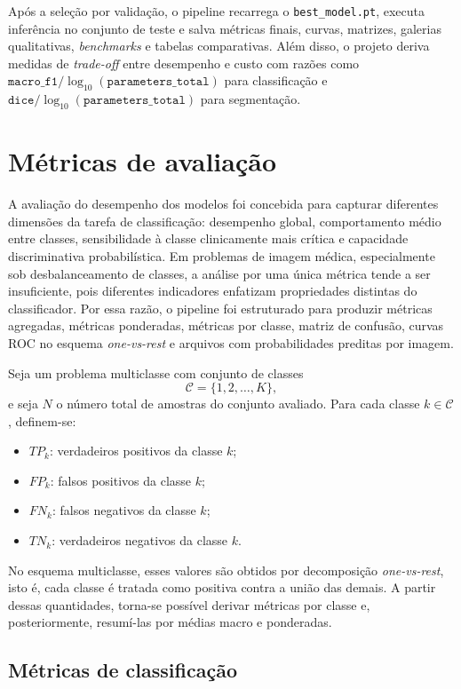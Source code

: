 \documentclass[tcc,capa]{texufpel}
\begin{document}
Após a seleção por validação, o pipeline recarrega o \texttt{best\_model.pt}, executa inferência no conjunto de teste e salva métricas finais, curvas, matrizes, galerias qualitativas, \textit{benchmarks} e tabelas comparativas. Além disso, o projeto deriva medidas de \textit{trade-off} entre desempenho e custo com razões como \(\texttt{macro\_f1}/\log_{10}(\texttt{parameters\_total})\) para classificação e \(\texttt{dice}/\log_{10}(\texttt{parameters\_total})\) para segmentação.

\section{Métricas de avaliação}

A avaliação do desempenho dos modelos foi concebida para capturar diferentes dimensões da tarefa de classificação: desempenho global, comportamento médio entre classes, sensibilidade à classe clinicamente mais crítica e capacidade discriminativa probabilística. Em problemas de imagem médica, especialmente sob desbalanceamento de classes, a análise por uma única métrica tende a ser insuficiente, pois diferentes indicadores enfatizam propriedades distintas do classificador. Por essa razão, o pipeline foi estruturado para produzir métricas agregadas, métricas ponderadas, métricas por classe, matriz de confusão, curvas ROC no esquema \textit{one-vs-rest} e arquivos com probabilidades preditas por imagem.

Seja um problema multiclasse com conjunto de classes
\[
\mathcal{C} = \{1,2,\dots,K\},
\]
e seja \(N\) o número total de amostras do conjunto avaliado. Para cada classe \(k \in \mathcal{C}\), definem-se:
\begin{itemize}
	\item \(TP_k\): verdadeiros positivos da classe \(k\);
	\item \(FP_k\): falsos positivos da classe \(k\);
	\item \(FN_k\): falsos negativos da classe \(k\);
	\item \(TN_k\): verdadeiros negativos da classe \(k\).
\end{itemize}

No esquema multiclasse, esses valores são obtidos por decomposição \textit{one-vs-rest}, isto é, cada classe é tratada como positiva contra a união das demais. A partir dessas quantidades, torna-se possível derivar métricas por classe e, posteriormente, resumí-las por médias macro e ponderadas.

\subsection{Métricas de classificação}
\end{document}
